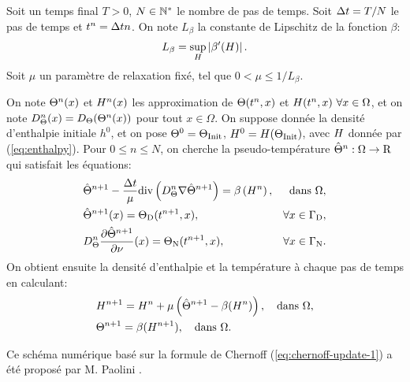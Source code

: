 Soit un temps final $T > 0$, $N\in \mathbb {\mathbb N^*}$ le nombre de pas de
temps. Soit $\Delta t = T / N$ le pas de temps et $t^n = \Delta t
n$. On note $L_\beta$ la constante de Lipschitz de la fonction
$\beta$:
\begin{equation}
  L_\beta = \sup_{H}\left\lvert \beta'(H) \right\rvert.
\end{equation}
Soit $\mu$ un paramètre de relaxation fixé, tel que $0 < \mu \leq
1/L_\beta$.

On note $\Theta^n(x)$ et $H^n(x)$ les
approximation de $\Theta(t^n, x)$ et $H(t^n,
x)\ \forall x\in \Omega$, et on note $D_\Theta^n(x) =
D_\Theta(\Theta^n(x))$ pour tout $x\in\Omega$.  On
suppose donnée la densité d'enthalpie initiale $h^0$, et on pose
$\Theta^0 = \Theta_\text{Init}$, $H^0 = H(\Theta_\text{Init})$,
avec $H$ donnée par (\ref{eq:enthalpy}). Pour $0 \leq n \leq
N$, on cherche la pseudo-température
$\hat{\Theta}^n:\Omega\to\mathrm R$ qui satisfait les équations:
\begin{align}
  &\hat\temperature^{n+1} - \frac{\timestep}{\mu} \div\parent{
    \electrolytetdiff^n \nabla\hat\temperature^{n+1}} = %
  \beta\parent{\enthalpydensity^n}, & \text{dans } \Omega,\label{eq:chernoff-heat}\\
  &\hat\temperature^{n+1}(x) = \temperature_{\mathrm D}(t^{n+1}, x), &
  \forall x\in%
  \Gamma_\mathrm{D},\label{eq:chernoff-dirichlet}\\
  &\electrolytetdiff^n\frac{\partial\hat\temperature^{n+1}}{\partial \nu}(x) = %
  \temperature_\mathrm{N}(t^{n+1}, x), %
  & \forall x \in \Gamma_\mathrm{N}.\label{eq:chernoff-neumann}
\end{align}
On obtient ensuite la densité d'enthalpie et la température à chaque
pas de temps en calculant:
\begin{align}
  &H^{n+1} = H^{n} +
  \mu\left( \hat{\Theta}^{n+1} - \beta(H^{n}) \right), \quad
  \text{dans } \Omega,\label{eq:chernoff-update-1}\\
  &\Theta^{n+1} = \beta(H^{n+1}), \quad\text{dans }\Omega.\label{eq:chernoff-update-2}
\end{align}

Ce schéma numérique basé sur la formule de Chernoff
(\ref{eq:chernoff-update-1}) a été proposé par M. Paolini
\cite{Paolini1988}.

